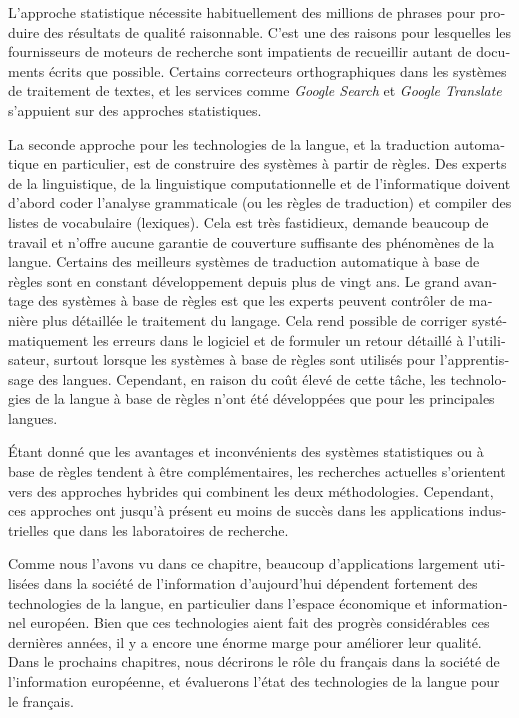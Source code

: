\begin{french}
\begin{multicols}{2}
L'approche statistique nécessite habituellement des millions
de phrases pour produire des résultats de qualité raisonnable. C'est une des raisons pour lesquelles les fournisseurs de moteurs de
recherche sont impatients de recueillir autant de documents écrits que
possible. Certains correcteurs orthographiques dans les systèmes de
traitement de textes, et les services comme {\em Google Search} et
{\em Google Translate} s'appuient sur des approches
statistiques.

La seconde approche pour les technologies de la langue, et la
traduction automatique en particulier, est de construire des systèmes
à partir de règles. Des experts de la linguistique, de la linguistique
computationnelle et de l'informatique doivent d'abord
coder l'analyse grammaticale (ou les règles de traduction) et
compiler des listes de vocabulaire (lexiques). Cela est très
fastidieux, demande beaucoup de travail et n'offre aucune garantie de
couverture suffisante des phénomènes de la langue. Certains des
meilleurs systèmes de traduction automatique à base de règles sont en
constant développement depuis plus de vingt ans. Le grand avantage des
systèmes à base de règles est que les experts peuvent contrôler de
manière plus détaillée le traitement du langage. Cela rend possible de
corriger systématiquement les erreurs dans le logiciel et de formuler
un retour détaillé à l'utilisateur, surtout lorsque les
systèmes à base de règles sont utilisés pour l'apprentissage
des langues. Cependant, en raison du coût élevé de cette tâche, les
technologies de la langue à base de règles n'ont été
développées que pour les principales langues.


Étant donné que les avantages et inconvénients des systèmes
statistiques ou à base de règles tendent à être complémentaires, les
recherches actuelles s'orientent vers des approches hybrides qui
combinent les deux méthodologies. Cependant, ces approches ont jusqu'à
présent eu moins de succès dans les applications industrielles que
dans les laboratoires de recherche.

Comme nous l'avons vu dans ce chapitre, beaucoup d'applications
largement utilisées dans la société de l'information d'aujourd'hui
dépendent fortement des technologies de la langue, en particulier dans
l'espace économique et informationnel européen. Bien que ces
technologies aient fait des progrès considérables ces dernières
années, il y a encore une énorme marge pour améliorer leur
qualité. Dans le prochains chapitres, nous décrirons le rôle du
français dans la société de l'information européenne, et évaluerons
l'état des technologies de la langue pour le français.
\end{multicols}


\end{french}
